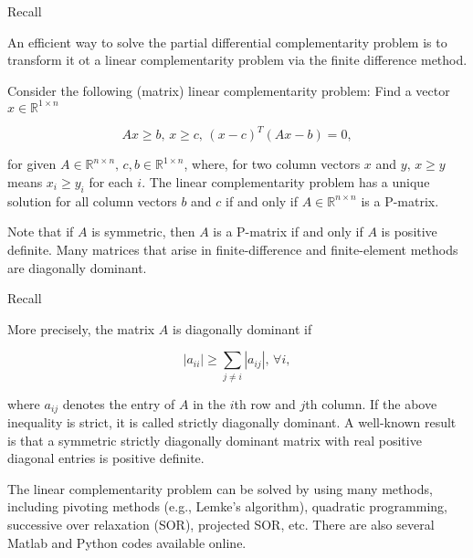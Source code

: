 \documentclass{beamer}
\begin{document}
\begin{frame}{Recall}

    {\footnotesize \footnotesize
    An efficient way to solve the partial differential complementarity problem is
    to transform it ot a linear complementarity problem via the finite difference
    method.
    \vspace{1em}

    Consider the following (matrix) linear complementarity problem: 
    Find a vector \( x \in \mathbb{R}^{1 \times n} \)

    \[
    Ax \geq b, \, x \geq c, \, (x - c)^T (Ax - b) = 0,
    \]

    for given \( A \in \mathbb{R}^{n \times n}, \, c, b \in \mathbb{R}^{1 \times n} \), where, 
    for two column vectors \( x \) and \( y, \, x \geq y \) means \( x_i \geq y_i \) for each \( i \).
    The linear complementarity problem has a unique solution for all
     column vectors \( b \) and \( c \) if and only if \( A \in \mathbb{R}^{n \times n} \) is a P-matrix.
    \vspace{1em}
    
    Note that if \( A \) is symmetric, then \( A \) is a P-matrix if and only if \( A \) is positive definite.
     Many matrices that arise in finite-difference and finite-element methods are diagonally dominant.
    }
    
\end{frame}
\begin{frame}{Recall}

    {\footnotesize \footnotesize
      More precisely, the matrix \( A \) is diagonally dominant if

    \[
    |a_{ii}| \geq \sum_{j \neq i} |a_{ij}|, \, \forall i,
    \]

    where \( a_{ij} \) denotes the entry of \( A \) in the \( i \)th row and \( j \)th column. 
    If the above inequality is strict, it is called strictly diagonally dominant. A well-known result is that a 
    symmetric strictly diagonally dominant matrix with real positive diagonal entries is positive definite.

    \vspace{1em}

    The linear complementarity problem can be solved by using many methods, 
    including pivoting methods (e.g., Lemke's algorithm), quadratic programming, 
    successive over relaxation (SOR), projected SOR, etc. There are also several 
    Matlab and Python codes available online.

    }
    
\end{frame}
\end{document}
